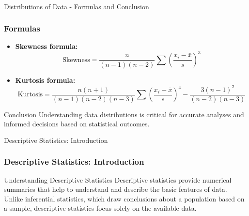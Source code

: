 \documentclass[aspectratio=169]{beamer}
\begin{document}
\begin{frame}[fragile]{Distributions of Data - Formulas and Conclusion}
    \frametitle{Formulas}
    \begin{itemize}
        \item \textbf{Skewness formula:}  
        \begin{equation}
            \text{Skewness} = \frac{n}{(n-1)(n-2)} \sum \left(\frac{x_i - \bar{x}}{s}\right)^3
        \end{equation}
        
        \item \textbf{Kurtosis formula:}  
        \begin{equation}
            \text{Kurtosis} = \frac{n(n+1)}{(n-1)(n-2)(n-3)} \sum \left(\frac{x_i - \bar{x}}{s}\right)^4 - \frac{3(n-1)^2}{(n-2)(n-3)}
        \end{equation}
    \end{itemize}
    
    \begin{block}{Conclusion}
        Understanding data distributions is critical for accurate analyses and informed decisions based on statistical outcomes.
    \end{block}
\end{frame}

\begin{frame}[fragile]{Descriptive Statistics: Introduction}
  \frametitle{Descriptive Statistics: Introduction}
  \begin{block}{Understanding Descriptive Statistics}
    Descriptive statistics provide numerical summaries that help to understand and describe the basic features of data. Unlike inferential statistics, which draw conclusions about a population based on a sample, descriptive statistics focus solely on the available data.
  \end{block}
\end{frame}
\end{document}
